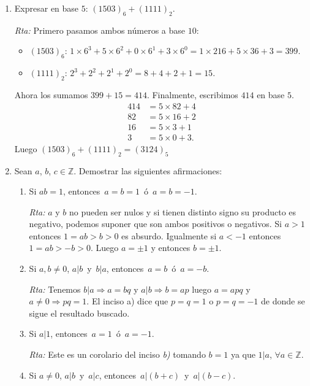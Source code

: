 \documentclass[a4paper,12pt,twoside,spanish,reqno]{amsbook}
\numberwithin{equation}{section}
\newcommand{\rta}{\noindent\textit{Rta: }}
\begin{document}
\begin{enumerate}
\begin{enumerate}
    \item
    $(10101101)_2 + (10011)_2$  \rta  $(11000000)_2$.
\end{enumerate}

\item Expresar en  base $5$:  $(1503)_6 + (1111)_2$.  

\rta  Primero pasamos ambos números a base $10$: 
\begin{itemize}
    \item $(1503)_6$: $1 \times 6^3+ 5 \times 6^2+0 \times 6^1+3 \times 6^0=1  \times 216+ 5 \times 36 +3=399$.
    \item $(1111)_2$:  $2^3+2^2+2^1+2^0= 8+4+2+1=15$. 
\end{itemize}
Ahora los sumamos $399+15= 414$. Finalmente,  escribimos $414$ en  base $5$. 
\begin{align*}
    414 &= 5 \times 82 + 4 \\
    82 &= 5 \times 16 + 2 \\
    16 &= 5 \times 3 + 1 \\
    3 &= 5 \times 0  +3.
\end{align*}
Luego  $(1503)_6 + (1111)_2 = (3124)_5$

\item Sean $a$, $b$, $c \in {\mathbb Z}$. Demostrar las siguientes afirmaciones:
\begin{enumerate}
    \item Si $ab=1$, entonces \,$a=b=1$\, \'o \,$a=b=-1$.
    
    \rta  $a$ y $b$ no pueden ser nulos y si tienen distinto signo su producto es negativo, podemos suponer que son ambos positivos o negativos. Si $a>1$ entonces $1=ab>b>0$ es absurdo. Igualmente si $a<-1$ entonces $1=ab >-b>0$. Luego $a=\pm1$ y entonces $b=\pm1$.
    
    \item Si $a,b \neq 0$,  $a| b$\, y \,$b | a$, entonces \,$a=b$\, \'o \,$a=-b$.
    
    \rta Tenemos $b\vert a \Rightarrow a=bq$ y   $a\vert b\Rightarrow b=ap$ luego $a=apq$ y  $a\neq0 \Rightarrow pq=1$. El inciso a)  dice que $p=q=1$ o $p=q=-1$ de donde se sigue el resultado buscado.
    
    \item Si $a | 1$, entonces \,$a=1$\, \'o \,$a=-1$.
    
    \rta Este es un corolario del inciso \textit{b)} tomando $b=1$ ya que $1\vert a$, $\forall a\in \mathbb{Z}$.
    
    \item Si $a \neq 0$, $a | b$\, y \,$a | c$, entonces \,$a | (b+c)$\, y \,$a | (b-c)$.
    

\end{enumerate}
\end{enumerate}
\end{document}
